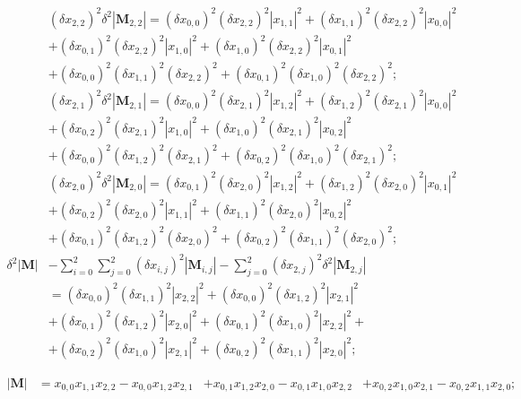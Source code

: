 \documentclass[twoside]{article}
\numberwithin{equation}{section}
\begin{document}
\begin{align*}
& (\delta x_{2,2})^2 \delta^2 |\mathbf{M}_{2,2}| = (\delta x_{0,0})^2 (\delta x_{2,2})^2 |x_{1,1}|^2 + (\delta x_{1,1})^2 (\delta x_{2,2})^2 |x_{0,0}|^2 \\
  &+  (\delta x_{0,1})^2 (\delta x_{2,2})^2 |x_{1,0}|^2 + (\delta x_{1,0})^2 (\delta x_{2,2})^2 |x_{0,1}|^2 \\
  &+ (\delta x_{0,0})^2 (\delta x_{1,1})^2 (\delta x_{2,2})^2 + (\delta x_{0,1})^2 (\delta x_{1,0})^2 (\delta x_{2,2})^2; \\
& (\delta x_{2,1})^2 \delta^2 |\mathbf{M}_{2,1}| = (\delta x_{0,0})^2 (\delta x_{2,1})^2 |x_{1,2}|^2 + (\delta x_{1,2})^2 (\delta x_{2,1})^2 |x_{0,0}|^2 \\
  &+  (\delta x_{0,2})^2 (\delta x_{2,1})^2 |x_{1,0}|^2 + (\delta x_{1,0})^2 (\delta x_{2,1})^2 |x_{0,2}|^2 \\
  &+ (\delta x_{0,0})^2 (\delta x_{1,2})^2 (\delta x_{2,1})^2  + (\delta x_{0,2})^2 (\delta x_{1,0})^2 (\delta x_{2,1})^2; \\
& (\delta x_{2,0})^2 \delta^2 |\mathbf{M}_{2,0}| = (\delta x_{0,1})^2 (\delta x_{2,0})^2 |x_{1,2}|^2 + (\delta x_{1,2})^2 (\delta x_{2,0})^2 |x_{0,1}|^2 \\
  &+  (\delta x_{0,2})^2 (\delta x_{2,0})^2 |x_{1,1}|^2 + (\delta x_{1,1})^2 (\delta x_{2,0})^2 |x_{0,2}|^2 \\
  &+ (\delta x_{0,1})^2 (\delta x_{1,2})^2 (\delta x_{2,0})^2 + (\delta x_{0,2})^2 (\delta x_{1,1})^2 (\delta x_{2,0})^2; \\
\delta^2 |\mathbf{M}| & - \sum_{i=0}^{2} \sum_{j=0}^{2} (\delta x_{i,j})^2 |\mathbf{M}_{i,j}| - \sum_{j=0}^{2} (\delta x_{2,j})^2 \delta^2 |\mathbf{M}_{2,j}| \\
  &= (\delta x_{0,0})^2 (\delta x_{1,1})^2 |x_{2,2}|^2 + (\delta x_{0,0})^2 (\delta x_{1,2})^2 |x_{2,1}|^2 \\
  &+ (\delta x_{0,1})^2 (\delta x_{1,2})^2 |x_{2,0}|^2 + (\delta x_{0,1})^2 (\delta x_{1,0})^2 |x_{2,2}|^2 + \\
  &+ (\delta x_{0,2})^2 (\delta x_{1,0})^2 |x_{2,1}|^2 + (\delta x_{0,2})^2 (\delta x_{1,1})^2 |x_{2,0}|^2;
\end{align*}

\begin{align*}
|\mathbf{M}| &= x_{0,0} x_{1,1} x_{2,2} - x_{0,0} x_{1,2} x_{2,1} 
	&+ x_{0,1} x_{1,2} x_{2,0} - x_{0,1} x_{1,0} x_{2,2}
    &+ x_{0,2} x_{1,0} x_{2,1} -  x_{0,2} x_{1,1} x_{2,0}; \\
\end{align*}
\end{document}
